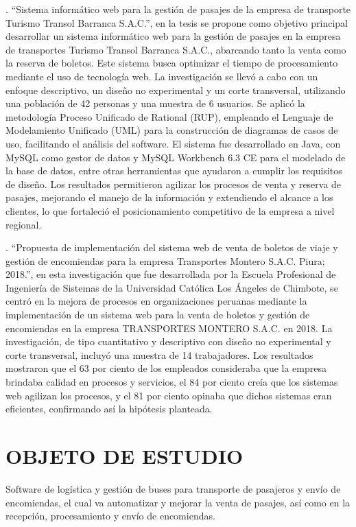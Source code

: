 	\textcite{sosa2019sistema}. ``Sistema informático web para la gestión de pasajes de la empresa de transporte Turismo Transol Barranca S.A.C.'', en la tesis se propone como objetivo principal desarrollar un sistema informático web para la gestión de pasajes en la empresa de transportes Turismo Transol Barranca S.A.C., abarcando tanto la venta como la reserva de boletos. Este sistema busca optimizar el tiempo de procesamiento mediante el uso de tecnología web. La investigación se llevó a cabo con un enfoque descriptivo, un diseño no experimental y un corte transversal, utilizando una población de 42 personas y una muestra de 6 usuarios. Se aplicó la metodología Proceso Unificado de Rational (RUP), empleando el Lenguaje de Modelamiento Unificado (UML) para la construcción de diagramas de casos de uso, facilitando el análisis del software. El sistema fue desarrollado en Java, con MySQL como gestor de datos y MySQL Workbench 6.3 CE para el modelado de la base de datos, entre otras herramientas que ayudaron a cumplir los requisitos de diseño. Los resultados permitieron agilizar los procesos de venta y reserva de pasajes, mejorando el manejo de la información y extendiendo el alcance a los clientes, lo que fortaleció el posicionamiento competitivo de la empresa a nivel regional.
	
	\textcite{vivas2019propuesta}. ``Propuesta de implementación del sistema web de venta de boletos de viaje y gestión de encomiendas para la empresa Transportes Montero S.A.C. Piura; 2018.'', en esta investigación que fue desarrollada por la Escuela Profesional de Ingeniería de Sistemas de la Universidad Católica Los Ángeles de Chimbote, se centró en la mejora de procesos en organizaciones peruanas mediante la implementación de un sistema web para la venta de boletos y gestión de encomiendas en la empresa TRANSPORTES MONTERO S.A.C. en 2018. La investigación, de tipo cuantitativo y descriptivo con diseño no experimental y corte transversal, incluyó una muestra de 14 trabajadores. Los resultados mostraron que el 63 por ciento de los empleados consideraba que la empresa brindaba calidad en procesos y servicios, el 84 por ciento creía que los sistemas web agilizan los procesos, y el 81 por ciento opinaba que dichos sistemas eran eficientes, confirmando así la hipótesis planteada.
	
\section{OBJETO DE ESTUDIO}

	Software de logística y gestión de buses para transporte de pasajeros y envío de encomiendas, el cual va automatizar y mejorar la venta de pasajes, así como en la recepción, procesamiento y envío de encomiendas.
	
